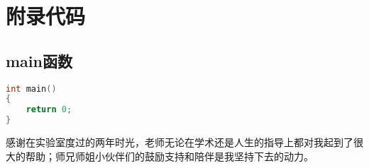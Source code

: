 \documentclass[winfonts,master,twoside,AutoFakeBold= {2}]{njuthesis}
\begin{document}















\appendix
\chapter{附录代码}
\label{app:1}
\section{main函数}
\begin{lstlisting}[language=C]
int main()
{
	return 0;
}
\end{lstlisting}


\begin{acknowledgement}
	感谢在实验室度过的两年时光，老师无论在学术还是人生的指导上都对我起到了很大的帮助；师兄师姐小伙伴们的鼓励支持和陪伴是我坚持下去的动力。
\end{acknowledgement}
\end{document}
